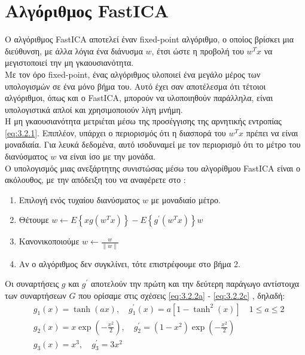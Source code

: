 \section{Αλγόριθμος \en FastICA} \label{sec:3.3}
\gr Ο αλγόριθμος \en FastICA \gr \cite{ica:10} αποτελεί έναν \en fixed-point \gr αλγόριθμο, ο οποίος βρίσκει μια διεύθυνση, με άλλα λόγια ένα διάνυσμα \en $w$, \gr έτσι ώστε η προβολή του \en $w^T x$ \gr να μεγιστοποιεί την μη γκαουσιανότητα.
\\ [0.5 \baselineskip]
Με τον όρο \en fixed-point, \gr ένας αλγόριθμος υλοποιεί ένα μεγάλο μέρος των υπολογισμών σε ένα μόνο βήμα του. Αυτό έχει σαν αποτέλεσμα ότι τέτοιοι αλγόριθμοι, όπως και ο \en FastICA, \gr μπορούν να υλοποιηθούν παράλληλα, είναι υπολογιστικά απλοί και χρησιμοποιούν λίγη μνήμη.
\\ [0.5 \baselineskip]
Η μη γκαουσιανότητα μετριέται μέσω της προσέγγισης της αρνητικής εντροπίας \eqref{eq:3.2.1}. Επιπλέον, υπάρχει ο περιορισμός ότι η διασπορά του \en $w^T x$ \gr πρέπει να είναι μοναδιαία. Για λευκά δεδομένα, αυτό ισοδυναμεί με τον περιορισμό ότι το μέτρο του διανύσματος \en $w$ \gr να είναι ίσο με την μονάδα.
\\ [0.5 \baselineskip]
Ο υπολογισμός μιας ανεξάρτητης συνιστώσας μέσω του αλγορίθμου \en FastICA \gr είναι ο ακόλουθος, με την απόδειξη του να αναφέρετε στο \cite{ica:10}:
\begin{enumerate}
    \item Επιλογή ενός τυχαίου διανύσματος \en $w$ με μοναδιαίο μέτρο.
    \item Θέτουμε \en $ w \leftarrow E\left\{ x g(w^T x) \right\} - E\left\{ g^{'}(w^T x)  \right\} w$\gr
    \item Κανονικοποιούμε \en $w \leftarrow \frac{w}{\parallel w \parallel }$  \gr 
    \item Αν ο αλγόριθμος δεν συγκλίνει, τότε επιστρέφουμε στο βήμα 2.
\end{enumerate}
Οι συναρτήσεις \en $g$ \gr και \en $g^{'}$ \gr αποτελούν την πρώτη και την δεύτερη παράγωγο αντίστοιχα των συναρτήσεων \en $G$ \gr που ορίσαμε στις σχέσεις \en \eqref{eq:3.2.2a} - \eqref{eq:3.2.2c} \gr, δηλαδή: \en
\begin{subequations}
\begin{align}
    &g_{1}(x) = \tanh (ax), \quad g_{1}^{'}(x) = a \left[ 1-\tanh^{2}(x) \right] \quad 1 \leq a \leq 2 \label{eq:3.3.1a} \\
    &g_{2}(x) = x \exp ( -\frac{x^2}{2}), \quad g_{2}^{'} = \left( 1-x^2 \right) \exp ( -\frac{x^2}{2})  \label{eq:3.3.1b} \\
    &g_{3}(x) = x^3, \quad g_{3}^{'} = 3x^2 \label{eq:3.3.1c}
\end{align}
\end{subequations}
